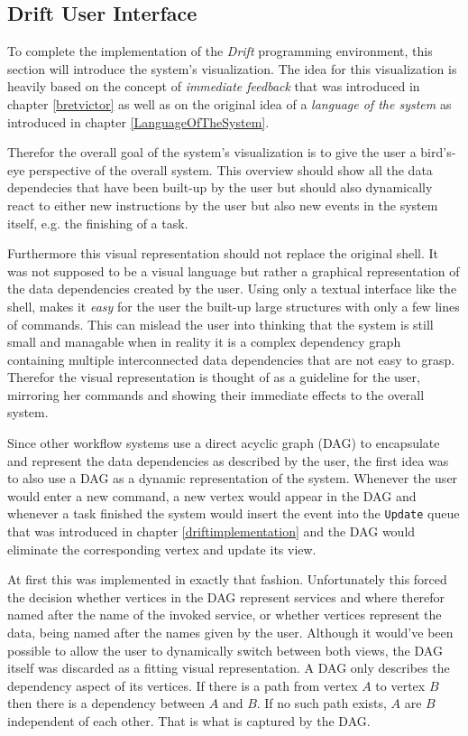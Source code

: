 \subsection{Drift User Interface}
\label{driftui}

To complete the implementation of the \textit{Drift} programming
environment, this section will introduce the system's visualization.
The idea for this visualization is heavily based on the concept
of \textit{immediate feedback} that was introduced in chapter \ref{bretvictor}
as well as on the original idea of a \textit{language of the system}
as introduced in chapter \ref{LanguageOfTheSystem}.

Therefor the overall goal of the system's visualization is to
give the user a bird's-eye perspective of the overall system.
This overview should show all the data dependecies that have
been built-up by the user but should also dynamically react
to either new instructions by the user but also new events in
the system itself, e.g. the finishing of a task.

Furthermore this visual representation should not replace the
original shell. It was not supposed to be a visual language
but rather a graphical representation of the data
dependencies created by the user. Using only a textual interface
like the shell, makes it \textit{easy} for the user the built-up
large structures with only a few lines of commands. This can
mislead the user into thinking that the system is still small
and managable when in reality it is a complex dependency graph
containing multiple interconnected data dependencies that
are not easy to grasp. Therefor the visual representation
is thought of as a guideline for the user, mirroring her commands
and showing their immediate effects to the overall system.
\newline

Since other workflow systems use a direct acyclic graph (DAG)
to encapsulate and represent the data dependencies as described
by the user, the first idea was to also use a DAG as a dynamic
representation of the system. Whenever the user would enter a new command,
a new vertex would appear in the DAG and whenever a task finished
the system would insert the event into the \texttt{Update} queue
that was introduced in chapter \ref{driftimplementation} and the
DAG would eliminate the corresponding vertex and update its view.

At first this was implemented in exactly that fashion. Unfortunately
this forced the decision whether vertices in the DAG represent
services and where therefor named after the name of the invoked
service, or whether vertices represent the data, being named after
the names given by the user. Although it would've been possible
to allow the user to dynamically switch between both views,
the DAG itself was discarded as a fitting visual representation.
A DAG only describes the dependency aspect of its vertices.
If there is a path from vertex $A$ to vertex $B$ then there is
a dependency between $A$ and $B$. If no such path exists, $A$
are $B$ independent of each other. That is what is captured by
the DAG.

